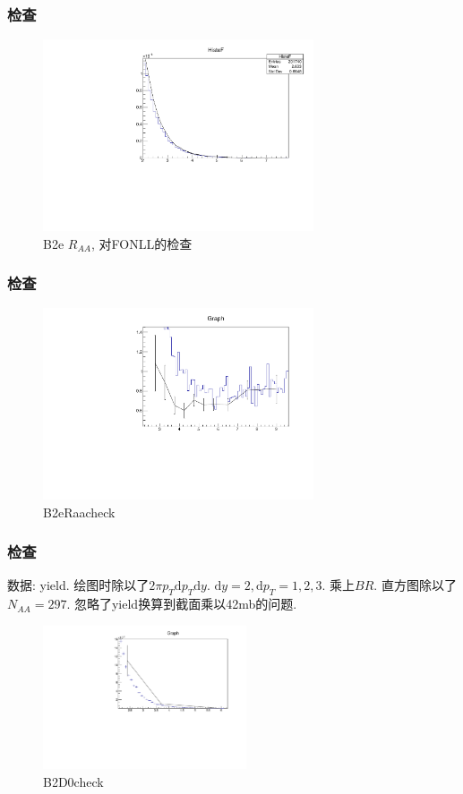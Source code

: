 \documentclass{beamer}
\newcommand{\rd}{\mathrm{d}}
\begin{document}
\begin{frame}
\frametitle{检查}
\begin{figure}[h]
	\includegraphics[width=8cm]{src/B2efonll.pdf}
	\caption{B2e $R_{AA}$, 对FONLL的检查}
\end{figure}
\end{frame}

\begin{frame}
	\frametitle{检查}
	\begin{figure}[h]
	\includegraphics[width=8cm]{src/checkRaa.pdf}
	\caption{B2eRaacheck}
\end{figure}
\end{frame}

\begin{frame}
	\frametitle{检查}
	{\kaishu 数据: yield. 绘图时除以了$2\pi p_T\rd p_T\rd y$. $\rd y=2,\rd p_T = 1,2,3$. {\color{blue} 乘上$BR$}. 直方图除以了$N_{AA}=297$. 忽略了yield换算到截面乘以42mb的问题.}
	\begin{figure}[h]
	\includegraphics[width=6cm]{src/checkD0.pdf}
	\caption{B2D0check}
\end{figure}
\end{frame}


\end{document}
